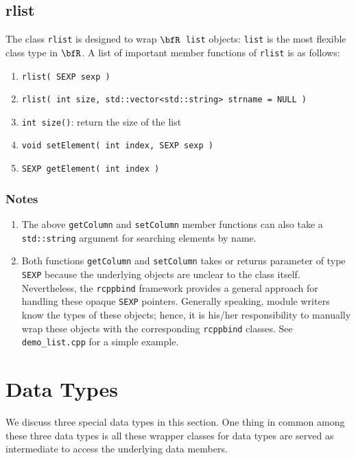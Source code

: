 \documentclass{article}
\newcommand{\R}{$\bfR$}
\begin{document}
\subsection{rlist}

The class \texttt{rlist} is designed to wrap \R\
\texttt{list} objects: \texttt{list} is the most flexible
class type in \R. A list of important member functions of
\texttt{rlist} is as follows:
\begin{enumerate}
  \item \texttt{rlist( SEXP sexp )}
  \item \texttt{rlist( int size, std::vector<std::string>
    strname = NULL )}
  \item \texttt{int size()}: return the size of the list
  \item \texttt{void setElement( int index, SEXP sexp )}
  \item \texttt{SEXP getElement( int  index )}
\end{enumerate}

\subsubsection*{Notes}
\begin{enumerate}
  \item The above \texttt{getColumn} and \texttt{setColumn}
    member functions can also take a \texttt{std::string}
    argument for searching elements by name.
  \item Both functions \texttt{getColumn} and
    \texttt{setColumn} takes or returns parameter of type
    \texttt{SEXP} because the underlying objects are unclear
    to the class itself.  Nevertheless, the \texttt{rcppbind}
    framework provides a general approach for handling these
    opaque \texttt{SEXP} pointers. Generally speaking,
    module writers know the types of these objects; hence, it
    is his/her responsibility to manually wrap these objects
    with the corresponding \texttt{rcppbind} classes. See
    \texttt{demo\_list.cpp} for a simple example.
\end{enumerate}

\section{Data Types}\label{sec:datatypes}

We discuss three special data types in this section. One
thing in common among these three data types is all these
wrapper classes for data types are served as intermediate to
access the underlying data members.
\end{document}
